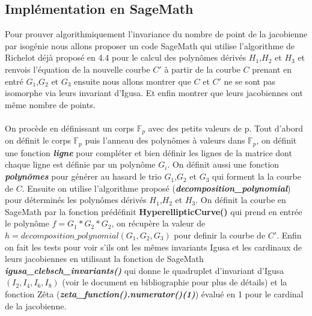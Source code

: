 \documentclass[12pt,a4paper]{article}
\begin{document}
	\subsection{Implémentation en SageMath}
	Pour prouver algorithmiquement l'invariance du nombre de point de la jacobienne par isogénie nous allons proposer un code SageMath qui utilise l'algorithme de Richelot déjà proposé en 4.4 pour le calcul des polynômes dérivés $H_1$,$H_2$ et $H_3$ et renvois l'équation de la nouvelle courbe $C'$ \`a partir de la courbe $C$ prenant en entré $G_1$,$G_2$ et $G_3$ ensuite nous allons montrer que $C$ et $C'$ ne se sont pas isomorphe via leurs invariant d'Igusa. Et enfin montrer que leurs jacobiennes ont même nombre de points. \\ \\
	On procède en définissant un corps $\mathbb{F}_p$ avec des petits valeurs de p. Tout d'abord on définit le corps $\mathbb{F}_p$ puis l'anneau des polynômes \`a valeurs dans $\mathbb{F}_p$, on définit une fonction \textbf{\textit{ligne}} pour compléter et bien définir les lignes de la matrice dont chaque ligne est définie par un polynôme $G_i$. On définit aussi une fonction \textit{\textbf{polynômes}} pour générer au hasard le trio $G_1$,$G_2$ et $G_3$ qui forment la la courbe de $C$. Ensuite on utilise l'algorithme proposé (\textbf{\textit{decomposition\_polynomial}}) pour déterminés les polynômes dérivés $H_1$,$H_2$ et $H_3$. On définit la courbe en SageMath par la fonction prédéfinit \textbf{HyperellipticCurve()} qui prend en entrée le polynôme $f = G_1*G_2*G_2$, on récupère la valeur de $h = decomposition\_polynomial(G_1,G_2,G_3)$ pour definir la courbe de $C'$. Enfin on fait les tests pour voir s'ils ont les mêmes invariants Igusa et les cardinaux de leurs jacobiennes en utilisant la fonction de SageMath \textbf{\textit{igusa\_clebsch\_invariants()}} qui donne le quadruplet d'invariant d'Igusa $(I_2,I_4,I_6,I_8)$ (voir le document en bibliographie pour plus de détails) et la fonction Zêta (\textbf{\textit{zeta\_function().numerator()(1)}}) évalué en 1 pour le cardinal de la jacobienne.  
\end{document}

